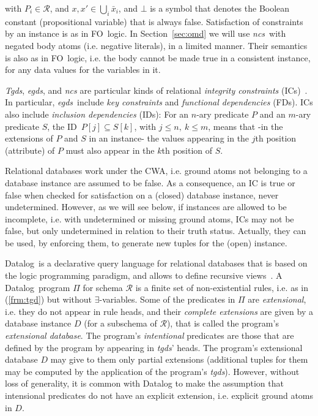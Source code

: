 \documentclass[format=acmsmall, review=false, screen=true]{acmart}
\newcommand{\ignore}[1]{}
\newcommand{\mc}[1]{\mathcal{ #1}}
\newcommand{\da}{Datalog}
\newcommand{\prg}{\Pi}
\newcommand{\schema}{\mc{R}}
\newcommand{\fds}{FDs}
\newcommand{\fo}{FO}
\newcommand{\idep}{ID}
\newcommand{\ideps}{IDs}
\newcommand{\egds}{{\em egds}}
\newcommand{\tgds}{{\em tgds}}
\newcommand{\ncs}{{\em ncs}}
\newcommand{\red}[1]{{#1}}
\begin{document}
\noindent  with \red{$P_i \in \mc{R}$, and} $x,x' \in \bigcup_i \bar{x}_i$, and $\bot$ is a symbol that denotes the Boolean constant (propositional variable) that is always false. Satisfaction of constraints by an instance is  as in \fo \ logic. \red{In Section~\ref{sec:omd} we will use \ncs \ with negated body atoms (i.e. negative literals), in a limited manner. Their semantics is also as in \fo \ logic, i.e. the body cannot be made true in a consistent instance, for any data values for the variables in it.}

{\em Tgds}, \egds, and {\em ncs} are particular kinds of relational {\em integrity constraints} (ICs)~\cite{abiteboul}. In particular,  \egds \ include {\em key constraints} and {\em functional dependencies} (\fds).
ICs also include {\em inclusion dependencies} (\ideps): For an $n$-ary predicate $P$ and an $m$-ary predicate $S$, the \idep \ $P[j] \subseteq S[k]$, with $j \leq n, \ k \leq m$, means that -in \red{the extensions of $P$ and $S$ in an instance}- the values appearing in the
$j$th position (attribute) of $P$ must also appear in the $k$th position of $S$.

\red{Relational databases work under the CWA, i.e. ground atoms not belonging to a database instance are assumed to be false. As a consequence, an IC is true or false when checked for satisfaction on a (closed) database instance, never undetermined. However, as we will see below, if instances are allowed to be incomplete, i.e. with undetermined or missing ground atoms, ICs may not be false, but only undetermined in relation to their truth status. Actually, they can be used, by enforcing them, to generate new tuples for the (open) instance.}




\da \ is a declarative query language for relational databases that is based on the logic programming paradigm, and allows to define recursive views~\cite{abiteboul,ceri}. A \da \ program $\prg$ for schema $\schema$ is a finite set of non-existential rules, i.e. as in (\ref{frm:tgd}) but without $\exists$-variables. Some of the predicates in $\prg$ are {\em extensional}, i.e. they do not appear in rule heads, and their \red{{\em complete extensions}} are given by a \red{database instance} $D$ (for a subschema of $\schema$), that is  \red{called the program's {\em extensional database}}. \ignore{\red{A predicate $P$ has the complete extension in $D$ if for every model $I$ of $\Pi$, $P(I)=P(D)$.}} The program's {\em intentional} predicates \red{are those that are defined by the program by appearing in \tgds' heads. The program's extensional database $D$ may give to them only partial extensions (additional tuples for them may be computed by the application of the program's \tgds). However, without loss of generality, it is common with Datalog to make the assumption that intensional predicates do not have an explicit extension, i.e. explicit ground atoms in $D$. }
\end{document}
